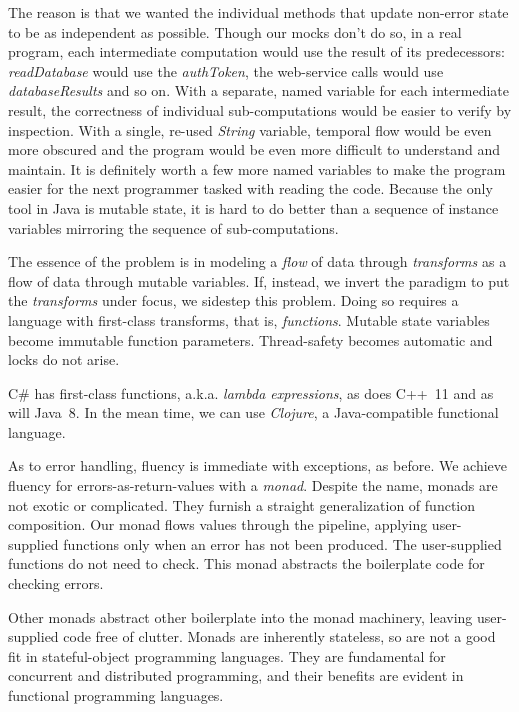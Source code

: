 \documentclass[11pt]{article}
\begin{document}
The reason is that we wanted the individual methods that update
non-error state to be as independent as possible. Though our mocks
don't do so, in a real program, each intermediate computation would
use the result of its predecessors: \emph{readDatabase} would use the
\emph{authToken}, the web-service calls would use \emph{databaseResults} and
so on. With a separate, named variable for each intermediate result,
the correctness of individual sub-computations would be easier to
verify by inspection. With a single, re-used \emph{String} variable,
temporal flow would be even more obscured and the program would be
even more difficult to understand and maintain. It is definitely
worth a few more named variables to make the program easier for the
next programmer tasked with reading the code. Because the only tool
in Java is mutable state, it is hard to do better than a sequence of
instance variables mirroring the sequence of sub-computations.

The essence of the problem is in modeling a \emph{flow} of data through
\emph{transforms} as a flow of data through mutable variables. If,
instead, we invert the paradigm to put the \emph{transforms} under focus,
we sidestep this problem. Doing so requires a language with
first-class transforms, that is, \emph{functions}. Mutable state
variables become immutable function parameters. Thread-safety
becomes automatic and locks do not arise.

\mbox{C\#} has first-class functions, a.k.a. \emph{lambda expressions},
as does \mbox{C++ 11} and as will \mbox{Java 8}. In the mean time,
we can use \emph{Clojure}, a Java-compatible functional language.

As to error handling, fluency is immediate with exceptions, as
before. We achieve fluency for errors-as-return-values with a
\emph{monad}. Despite the name, monads are not exotic or complicated.
They furnish a straight generalization of function composition. Our
monad flows values through the pipeline, applying user-supplied
functions only when an error has not been produced. The
user-supplied functions do not need to check. This monad abstracts
the boilerplate code for checking errors.

Other monads abstract other boilerplate into the monad machinery,
leaving user-supplied code free of clutter. Monads are inherently
stateless, so are not a good fit in stateful-object programming
languages. They are fundamental for concurrent and distributed
programming, and their benefits are evident in functional
programming languages.
\end{document}
